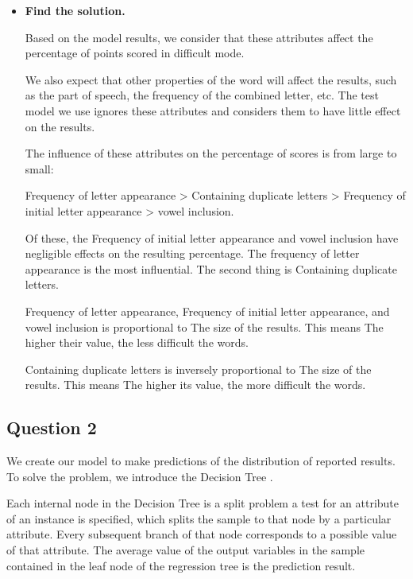 \documentclass{mcmthesis}
\begin{document}
\begin{itemize}
    As shown in Figure 12, the trends of the two lines are about the same. Accordingly, the attributes of the word have an impact on how difficult an answer word is and consequently influence the percentage of scores reported in Hard Mode. 

    \item {\bf Find the solution.}
    
    Based on the model results, we consider that these attributes affect the percentage of points scored in difficult mode.

    We also expect that other properties of the word will affect the results, such as the part of speech, the frequency of the combined letter, etc. The test model we use ignores these attributes and considers them to have little effect on the results.

    The influence of these attributes on the percentage of scores is from large to small:

    Frequency of letter appearance > Containing duplicate letters > Frequency of initial letter appearance >  vowel inclusion.

    Of these, the Frequency of initial letter appearance and vowel inclusion have negligible effects on the resulting percentage. The frequency of letter appearance is the most influential. The second thing is Containing duplicate letters.

    Frequency of letter appearance, Frequency of initial letter appearance, and vowel inclusion is proportional to The size of the results. This means The higher their value, the less difficult the words.
    
    Containing duplicate letters is inversely proportional to The size of the results. This means The higher its value, the more difficult the words.

\end{itemize}

\subsection{Question 2}

We create our model to make predictions of the distribution of reported results. To solve the problem, we introduce the Decision Tree \cite{7}.
    
 Each internal node in the Decision Tree is a split problem a test for an attribute of an instance is specified, which splits the sample to that node by a particular attribute. Every subsequent branch of that node corresponds to a possible value of that attribute. The average value of the output variables in the sample contained in the leaf node of the regression tree is the prediction result.
\end{document}

